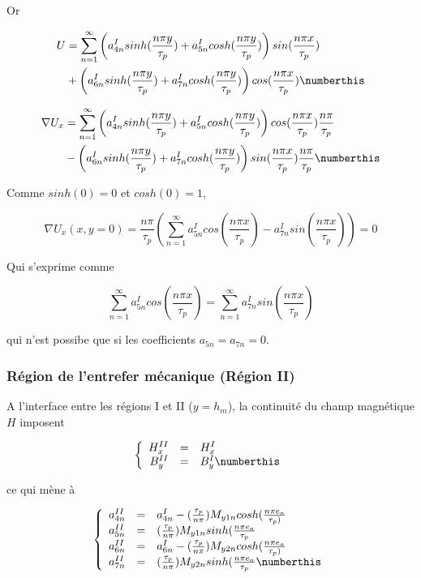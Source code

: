 Or

\begin{align*}
    U &= \sum_{n=1}^\infty \left(a_{4n}^Isinh(\frac{n\pi y}{\tau_p})+a_{5n}^Icosh(\frac{n\pi y}{\tau_p})\right)sin(\frac{n\pi x}{\tau_p})\\
    &+ \left(a_{6n}^Isinh(\frac{n\pi y}{\tau_p})+a_{7n}^Icosh(\frac{n\pi y}{\tau_p})\right)cos(\frac{n\pi x}{\tau_p}) \numberthis
\end{align*}

\begin{align*}
    \nabla U_x &= \sum_{n=1}^\infty \left(a_{4n}^Isinh(\frac{n\pi y}{\tau_p})+a_{5n}^Icosh(\frac{n\pi y}{\tau_p})\right)cos(\frac{n\pi x}{\tau_p})\frac{n\pi}{\tau_p}\\
    &- \left(a_{6n}^Isinh(\frac{n\pi y}{\tau_p})+a_{7n}^Icosh(\frac{n\pi y}{\tau_p})\right)sin(\frac{n\pi x}{\tau_p})\frac{n\pi}{\tau_p} \numberthis
\end{align*}

Comme $sinh(0)=0$ et $cosh(0)=1$, 

\begin{equation}
    \nabla U_x(x,y=0) = \frac{n\pi}{\tau_p}\left(\sum_{n=1}^\infty a_{5n}^Icos(\frac{n\pi x}{\tau_p}) -a_{7n}^Isin(\frac{n\pi x}{\tau_p})\right) = 0
\end{equation}

Qui s'exprime comme

\begin{equation}
    \sum_{n=1}^\infty a_{5n}^Icos(\frac{n\pi x}{\tau_p}) =\sum_{n=1}^\infty a_{7n}^Isin(\frac{n\pi x}{\tau_p})
\end{equation}

qui n'est possibe que si les coefficients $a_{5n}=a_{7n}=0$.

\subsubsection{Région de l'entrefer mécanique (Région II)}
A l'interface entre les régions I et II ($y=h_m$), la continuité du champ magnétique $H$ imposent

\[
\left\{
\begin{array}{r c l}
H_x^{II} &=& H_x^{I}\\
B_y^{II} &=& B_y^{I}\numberthis
\end{array}
\right.
\]

ce qui mène à 

\[
\left\{
\begin{array}{r c l}
a_{4n}^{II}&=&a_{4n}^I-(\frac{\tau_p}{n\pi})M_{y1n}cosh(\frac{n\pi e_a}{\tau_p)}\\
a_{5n}^{II} &=& (\frac{\tau_p}{n\pi})M_{y1n}sinh(\frac{n\pi e_a}{\tau_p}\\
a_{6n}^{II}&=&a_{6n}^I-(\frac{\tau_p}{n\pi})M_{y2n}cosh(\frac{n\pi e_a}{\tau_p)}\\
a_{7n}^{II} &=& (\frac{\tau_p}{n\pi})M_{y2n}sinh(\frac{n\pi e_a}{\tau_p} \numberthis
\end{array}
\right.
\]

